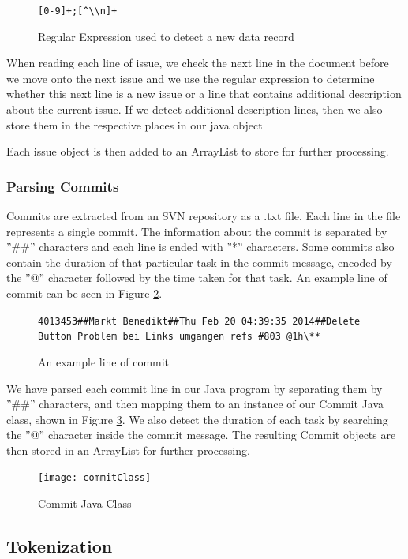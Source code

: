 \begin{figure}
\centering
\verb/[0-9]+;[^\\n]+/
\caption{Regular Expression used to detect a new data record}
\label{fig:regexp}
\end{figure}

When reading each line of issue, we check the next line in the document before we move onto the next issue and we use the regular expression to determine whether this next line is a new issue or a line that contains additional description about the current issue. If we detect additional description lines, then we also store them in the respective places in our java object

Each issue object is then added to an ArrayList to store for further processing.

\subsubsection{Parsing Commits}

Commits are extracted from an SVN repository as a .txt file. Each line in the file represents a single commit. The information about the commit is separated by ''\#\#'' characters and each line is ended with ''\**'' characters. Some commits also contain the duration of that particular task in the commit message, encoded by the ''@'' character followed by the time taken for that task. An example line of commit can be seen in Figure \ref{fig:commitLine}.

\begin{figure}
\centering
\verb/4013453##Markt Benedikt##Thu Feb 20 04:39:35 2014##Delete Button Problem bei Links umgangen refs #803 @1h\**  /
\caption{An example line of commit}
\label{fig:commitLine}
\end{figure}

We have parsed each commit line in our Java program by separating them by ''\#\#'' characters, and then mapping them to an instance of our Commit Java class, shown in Figure \ref{fig:commit}. We also detect the duration of each task by searching the ''@'' character inside the commit message. The resulting Commit objects are then stored in an ArrayList for further processing.

\begin{figure}
\centering
\texttt{[image: commitClass]}
\caption{Commit Java Class}
\label{fig:commit}
\end{figure}

\subsection{Tokenization}

